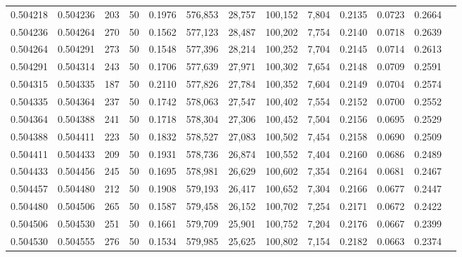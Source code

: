 \begin{tabular}{rrrrrrrrrrrrr}
0.504218 & 0.504236 & 203 &  50 &                                     0.1976 & 576,853 &  28,757 & 100,152 &   7,804 & 0.2135 & 0.0723 & 0.2664 \\
0.504236 & 0.504264 & 270 &  50 &                                     0.1562 & 577,123 &  28,487 & 100,202 &   7,754 & 0.2140 & 0.0718 & 0.2639 \\
0.504264 & 0.504291 & 273 &  50 &                                     0.1548 & 577,396 &  28,214 & 100,252 &   7,704 & 0.2145 & 0.0714 & 0.2613 \\
0.504291 & 0.504314 & 243 &  50 &                                     0.1706 & 577,639 &  27,971 & 100,302 &   7,654 & 0.2148 & 0.0709 & 0.2591 \\
0.504315 & 0.504335 & 187 &  50 &                                     0.2110 & 577,826 &  27,784 & 100,352 &   7,604 & 0.2149 & 0.0704 & 0.2574 \\
0.504335 & 0.504364 & 237 &  50 &                                     0.1742 & 578,063 &  27,547 & 100,402 &   7,554 & 0.2152 & 0.0700 & 0.2552 \\
0.504364 & 0.504388 & 241 &  50 &                                     0.1718 & 578,304 &  27,306 & 100,452 &   7,504 & 0.2156 & 0.0695 & 0.2529 \\
0.504388 & 0.504411 & 223 &  50 &                                     0.1832 & 578,527 &  27,083 & 100,502 &   7,454 & 0.2158 & 0.0690 & 0.2509 \\
0.504411 & 0.504433 & 209 &  50 &                                     0.1931 & 578,736 &  26,874 & 100,552 &   7,404 & 0.2160 & 0.0686 & 0.2489 \\
0.504433 & 0.504456 & 245 &  50 &                                     0.1695 & 578,981 &  26,629 & 100,602 &   7,354 & 0.2164 & 0.0681 & 0.2467 \\
0.504457 & 0.504480 & 212 &  50 &                                     0.1908 & 579,193 &  26,417 & 100,652 &   7,304 & 0.2166 & 0.0677 & 0.2447 \\
0.504480 & 0.504506 & 265 &  50 &                                     0.1587 & 579,458 &  26,152 & 100,702 &   7,254 & 0.2171 & 0.0672 & 0.2422 \\
0.504506 & 0.504530 & 251 &  50 &                                     0.1661 & 579,709 &  25,901 & 100,752 &   7,204 & 0.2176 & 0.0667 & 0.2399 \\
0.504530 & 0.504555 & 276 &  50 &                                     0.1534 & 579,985 &  25,625 & 100,802 &   7,154 & 0.2182 & 0.0663 & 0.2374 \\

\end{tabular}
